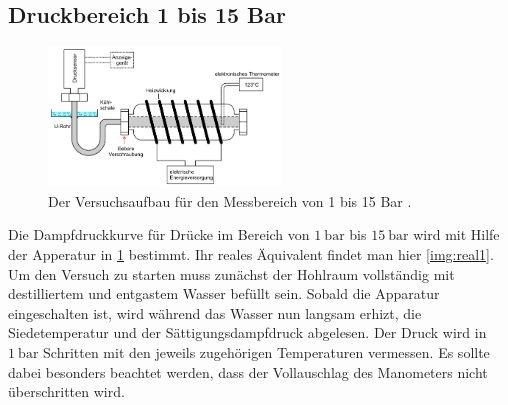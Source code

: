 \subsection{Druckbereich 1 bis 15 Bar}
\begin{figure}[H]
    \centering
    \includegraphics[width=0.55\textwidth]{images/Abbildung4.PNG}
    \caption{Der Versuchsaufbau für den Messbereich von 1 bis 15 Bar \protect \cite{V203}.}
    \label{img:aufbau2}
\end{figure}
Die Dampfdruckkurve für Drücke im Bereich von $\SI{1}{\bar}$ bis $\SI{15}{\bar}$ wird mit Hilfe der Apperatur in \ref{img:aufbau2} bestimmt. 
Ihr reales Äquivalent findet man hier \ref{img:real1}.\\
Um den Versuch zu starten muss zunächst der Hohlraum vollständig mit destilliertem und entgastem Wasser befüllt sein.
Sobald die Ap­pa­ra­tur eingeschalten ist, wird während das Wasser nun langsam erhizt, 
die Siedetemperatur und der Sättigungsdampfdruck abgelesen. Der Druck wird in $\SI{1}{\bar}$ Schritten mit den jeweils zugehörigen Temperaturen vermessen. 
Es sollte dabei besonders beachtet werden, dass der Vollauschlag des Manometers nicht überschritten wird.  